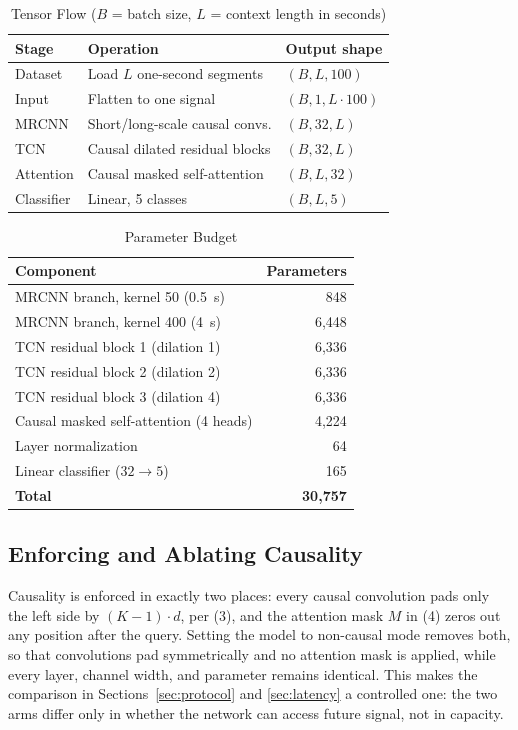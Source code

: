 \documentclass[conference]{IEEEtran}
\begin{document}
\begin{table}[t]
\caption{Tensor Flow ($B$ = batch size, $L$ = context length in seconds)}
\label{tab:tensors}
\centering
\begin{tabular}{lll}
\toprule
Stage & Operation & Output shape \\
\midrule
Dataset    & Load $L$ one-second segments   & $(B, L, 100)$ \\
Input      & Flatten to one signal          & $(B, 1, L\cdot100)$ \\
MRCNN      & Short/long-scale causal convs. & $(B, 32, L)$ \\
TCN        & Causal dilated residual blocks & $(B, 32, L)$ \\
Attention  & Causal masked self-attention   & $(B, L, 32)$ \\
Classifier & Linear, 5 classes              & $(B, L, 5)$ \\
\bottomrule
\end{tabular}
\end{table}

\begin{table}[t]
\caption{Parameter Budget}
\label{tab:params}
\centering
\begin{tabular}{lr}
\toprule
Component & Parameters \\
\midrule
MRCNN branch, kernel 50 (0.5~s)   & 848 \\
MRCNN branch, kernel 400 (4~s)    & 6{,}448 \\
TCN residual block 1 (dilation 1) & 6{,}336 \\
TCN residual block 2 (dilation 2) & 6{,}336 \\
TCN residual block 3 (dilation 4) & 6{,}336 \\
Causal masked self-attention (4 heads) & 4{,}224 \\
Layer normalization               & 64 \\
Linear classifier ($32 \to 5$)    & 165 \\
\midrule
\textbf{Total} & \textbf{30{,}757} \\
\bottomrule
\end{tabular}
\end{table}

\subsection{Enforcing and Ablating Causality}

Causality is enforced in exactly two places: every causal convolution pads only the left side by
$(K-1)\cdot d$, per (3), and the attention mask $M$ in (4) zeros out any position after the query.
Setting the model to non-causal mode removes both, so that convolutions pad symmetrically and no
attention mask is applied, while every layer, channel width, and parameter remains identical. This
makes the comparison in Sections~\ref{sec:protocol} and \ref{sec:latency} a controlled one: the two
arms differ only in whether the network can access future signal, not in capacity.
\end{document}
